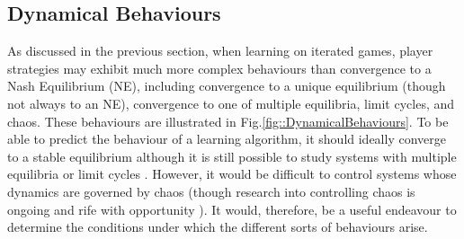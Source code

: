 \documentclass[sigconf,anonymous]{aamas}
\begin{document}
\subsection{Dynamical Behaviours}
\label{sec::DynamicalBehaviours}

    As discussed in the previous section, when learning on iterated
    games, player strategies may exhibit much more complex behaviours
    than convergence to a Nash Equilibrium (NE), including convergence
    to a unique equilibrium (though not always to an NE), convergence
    to one of multiple equilibria, limit cycles, and chaos. These
    behaviours are illustrated in
    Fig.\ref{fig::DynamicalBehaviours}. To be able to predict the
    behaviour of a learning algorithm, it should ideally converge to a
    stable equilibrium although it is still possible to study systems
    with multiple equilibria or limit cycles
    \cite{Strogatz2000}. However, it would be difficult to control
    systems whose dynamics are governed by chaos (though research into
    controlling chaos is ongoing and rife with opportunity
    \cite{Fradkov2009}). It would, therefore, be a useful endeavour to
    determine the conditions under which the different sorts of behaviours
    arise.
\end{document}
